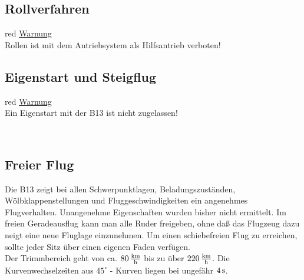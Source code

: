 \subsection{Rollverfahren}
\begin{color}{red}
\large{\underline{Warnung}}\\
Rollen ist mit dem Antriebsystem als Hilfsantrieb verboten!
\end{color}

\subsection{Eigenstart und Steigflug}
\begin{color}{red}
\large{\underline{Warnung}}\\
Ein Eigenstart mit der B13 ist nicht zugelassen!
\end{color}\\
\newline

\subsection{Freier Flug}
Die B13 zeigt bei allen Schwerpunktlagen, Beladungszuständen, Wölbklappenstellungen und Fluggeschwindigkeiten ein angenehmes Flugverhalten. Unangenehme Eigenschaften wurden bisher nicht ermittelt. Im freien Geradeausflug kann man alle Ruder freigeben, ohne daß das Flugzeug dazu neigt eine neue Fluglage einzunehmen. Um einen schiebefreien Flug zu erreichen, sollte jeder Sitz über einen eigenen Faden verfügen.\\
\newline
Der Trimmbereich geht von ca. $\unit[80]{\frac{km}{h}}$ bis zu über $\unit[220]{\frac{km}{h}}$. Die Kurvenwechselzeiten aus $45^{\circ}$ - Kurven liegen bei ungefähr $\unit[4]{s}$.\\

